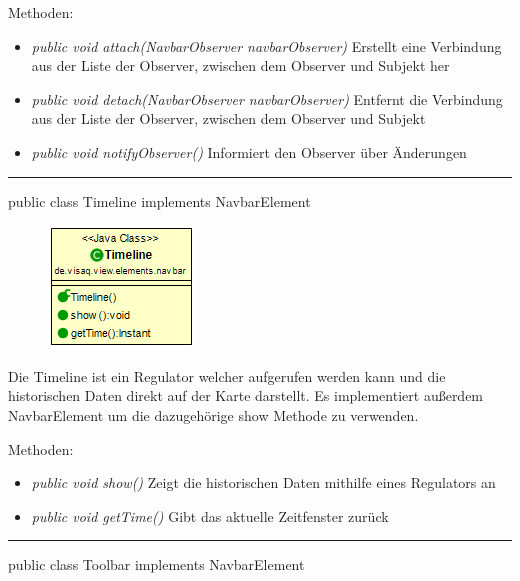 \begin{minipage}{0.6\textwidth}
Methoden:
\begin{itemize} 
    \item \emph{public void attach(NavbarObserver navbarObserver)} Erstellt eine Verbindung aus der Liste der Observer, zwischen dem Observer und Subjekt her
    \item \emph{public void detach(NavbarObserver navbarObserver)} Entfernt die Verbindung aus der Liste der Observer, zwischen dem Observer und Subjekt
    \item \emph{public void notifyObserver()} Informiert den Observer über Änderungen
\end{itemize}


\rule{\textwidth}{0.4pt} 
public class Timeline implements NavbarElement

\begin{minipage}{0.3\textwidth}
    \begin{figure}[H]
        \includegraphics[scale = 0.5]{media/frontend/view/de.view.elements.navbar/Timeline_Class.png}
    \end{figure}
    \end{minipage} \hfill
    \begin{minipage}{0.6\textwidth}
Die Timeline ist ein Regulator welcher aufgerufen werden kann und die historischen Daten direkt auf der Karte darstellt. Es implementiert außerdem NavbarElement um die dazugehörige show Methode zu verwenden.
\end{minipage}

Methoden:
\begin{itemize} 
    \item \emph{public void show()} Zeigt die historischen Daten mithilfe eines Regulators an 
    \item \emph{public void getTime()} Gibt das aktuelle Zeitfenster zurück
\end{itemize}

\rule{\textwidth}{0.4pt} 
public class Toolbar implements NavbarElement


\end{minipage}

